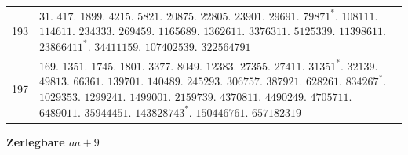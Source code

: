 \begin{longtable}{@{}r|p{\dimexpr\linewidth-38pt\relax}@{}}
193 & $31.$ $417.$ $1899.$ $4215.$ $5821.$ $20875.$ $22805.$ $23901.$ $29691.$ $79871^{*}.$ $108111.$ $114611.$ $234333.$ $269459.$ $1165689.$ $1362611.$ $3376311.$ $5125339.$ $11398611.$ $23866411^{*}.$ $34411159.$ $107402539.$ $322564791$\\
197 & $169.$ $1351.$ $1745.$ $1801.$ $3377.$ $8049.$ $12383.$ $27355.$ $27411.$ $31351^{*}.$ $32139.$ $49813.$ $66361.$ $139701.$ $140489.$ $245293.$ $306757.$ $387921.$ $628261.$ $834267^{*}.$ $1029353.$ $1299241.$ $1499001.$ $2159739.$ $4370811.$ $4490249.$ $4705711.$ $6489011.$ $35944451.$ $143828743^{*}.$ $150446761.$ $657182319$\\
\end{longtable}\endgroup
\par\medskip{}
\centerline{\textbf{Zerlegbare $aa+9$}}\nobreak\smallskip
\begingroup\small\setlength{\tabcolsep}{4pt}
